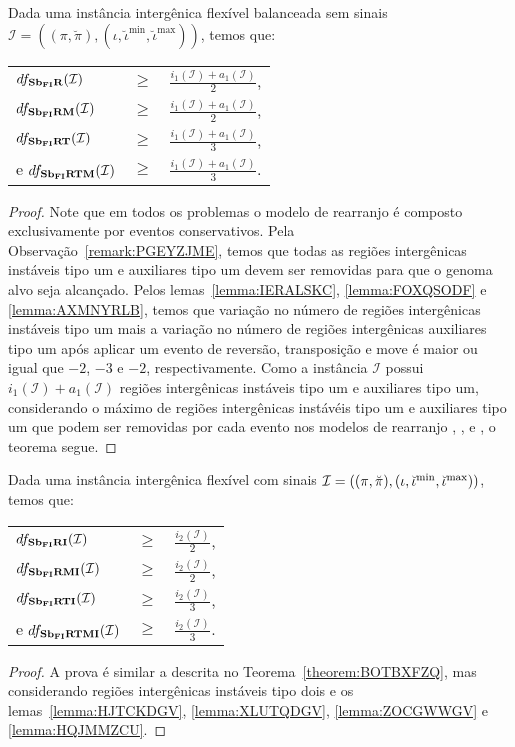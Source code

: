 \begin{theorem}\label{theorem:KKKUCDHN}
Dada uma instância intergênica flexível balanceada sem sinais $\mathcal{I} = ((\pi,\breve\pi),(\iota,\breve\iota^{\min},\breve\iota^{\max}))$, temos que:

\begin{tabular}{lll}
  $df_{\textbf{Sb\textsubscript{FI}R}}(\mathcal{I})$      & $ \ge $ & $\frac{i_1(\mathcal{I}) + a_1(\mathcal{I})}{2}$, \\ 
  $df_{\textbf{Sb\textsubscript{FI}RM}}(\mathcal{I})$     & $ \ge $ & $\frac{i_1(\mathcal{I}) + a_1(\mathcal{I})}{2}$, \\
  $df_{\textbf{Sb\textsubscript{FI}RT}}(\mathcal{I})$     & $ \ge $ & $\frac{i_1(\mathcal{I}) + a_1(\mathcal{I})}{3}$, \\
  e $df_{\textbf{Sb\textsubscript{FI}RTM}}(\mathcal{I})$  & $ \ge $ & $\frac{i_1(\mathcal{I}) + a_1(\mathcal{I})}{3}$. \\
\end{tabular}
\end{theorem}
\begin{proof}
Note que em todos os problemas o modelo de rearranjo é composto exclusivamente por eventos conservativos. Pela Observação~\ref{remark:PGEYZJME}, temos que todas as regiões intergênicas instáveis tipo um e auxiliares tipo um devem ser removidas para que o genoma alvo seja alcançado. Pelos lemas~\ref{lemma:IERALSKC}, \ref{lemma:FOXQSODF} e \ref{lemma:AXMNYRLB}, temos que variação no número de regiões intergênicas instáveis tipo um mais a variação no número de regiões intergênicas auxiliares tipo um após aplicar um evento de reversão, transposição e move é maior ou igual que $-2$, $-3$ e $-2$, respectivamente. Como a instância $\mathcal{I}$ possui $i_1(\mathcal{I}) + a_1(\mathcal{I})$ regiões intergênicas instáveis tipo um e auxiliares tipo um, considerando o máximo de regiões intergênicas instávéis tipo um e auxiliares tipo um que podem ser removidas por cada evento nos modelos de rearranjo \SbFIR{}, \SbFIRM{}, \SbFIRT{} e \SbFIRTM{}, o teorema segue.
\end{proof}

\begin{theorem}\label{theorem:ROVRTGBJ}
Dada uma instância intergênica flexível com sinais $\mathcal{I} = ((\pi,\breve\pi),(\iota,\breve\iota^{\min},\break\breve\iota^{\max}))$, temos que:

\begin{tabular}{lll}
  $df_{\textbf{Sb\textsubscript{FI}RI}}(\mathcal{I})$     & $ \ge $ & $\frac{i_2(\mathcal{I})}{2}$, \\
  $df_{\textbf{Sb\textsubscript{FI}RMI}}(\mathcal{I})$    & $ \ge $ & $\frac{i_2(\mathcal{I})}{2}$, \\
  $df_{\textbf{Sb\textsubscript{FI}RTI}}(\mathcal{I})$    & $ \ge $ & $\frac{i_2(\mathcal{I})}{3}$, \\
  e $df_{\textbf{Sb\textsubscript{FI}RTMI}}(\mathcal{I})$ & $ \ge $ & $\frac{i_2(\mathcal{I})}{3}$. \\
\end{tabular}
\end{theorem}
\begin{proof}
A prova é similar a descrita no Teorema~\ref{theorem:BOTBXFZQ}, mas considerando regiões intergênicas instáveis tipo dois e os lemas~\ref{lemma:HJTCKDGV}, \ref{lemma:XLUTQDGV}, \ref{lemma:ZOCGWWGV} e \ref{lemma:HQJMMZCU}.
\end{proof}

